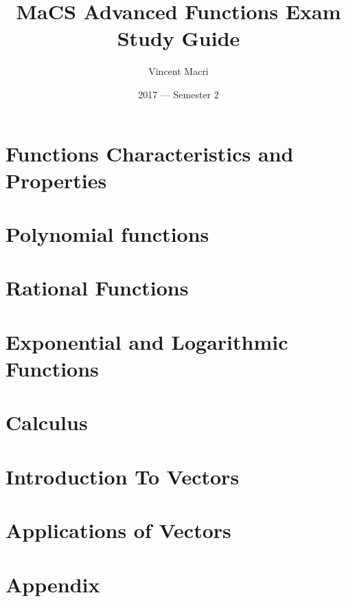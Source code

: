 \documentclass[letterpaper,12pt]{report}
\title{MaCS Advanced Functions Exam Study Guide}
\author{Vincent Macri}
\date{2017 --- Semester 2}
\begin{document}
	\maketitle
	\clearpage
	\tableofcontents
	\clearpage

	\part{Functions Characteristics and Properties}
		
	\part{Polynomial functions}
		
		
	\part{Rational Functions}
		
	\part{Exponential and Logarithmic Functions}
		
	\part{Calculus}
		
	\part{Introduction To Vectors}
		
	\part{Applications of Vectors}
		
	\appendix
	\part*{Appendix}
		
\end{document}
